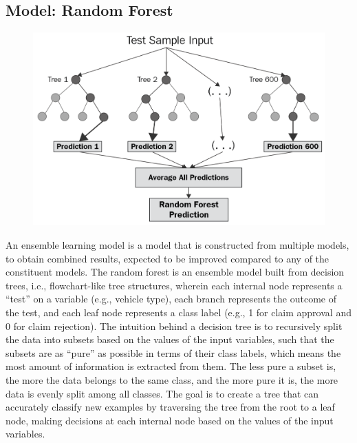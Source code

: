 \documentclass{article}
\begin{document}
\hypertarget{model-random-forest}{%
\subsection{\texorpdfstring{Model: Random Forest
\label{subsec:model-rf}}{Model: Random Forest }}\label{model-random-forest}}

\begin{figure}
\includegraphics[width=0.9\linewidth]{./figures/rf-model.png}
\end{figure}

An ensemble learning model is a model that is constructed from multiple
models, to obtain combined results, expected to be improved compared to
any of the constituent models. The random forest is an ensemble model
built from decision trees, i.e., flowchart-like tree structures, wherein
each internal node represents a ``test'' on a variable (e.g., vehicle
type), each branch represents the outcome of the test, and each leaf
node represents a class label (e.g., 1 for claim approval and 0 for
claim rejection). The intuition behind a decision tree is to recursively
split the data into subsets based on the values of the input variables,
such that the subsets are as ``pure'' as possible in terms of their
class labels, which means the most amount of information is extracted
from them. The less pure a subset is, the more the data belongs to the
same class, and the more pure it is, the more data is evenly split among
all classes. The goal is to create a tree that can accurately classify
new examples by traversing the tree from the root to a leaf node, making
decisions at each internal node based on the values of the input
variables.
\end{document}

